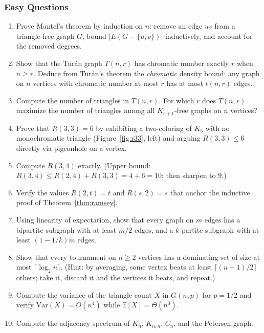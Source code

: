 \documentclass{article}
\theoremstyle{definition}
\begin{document}
\subsubsection{Easy Questions}
\begin{enumerate}
\item Prove Mantel's theorem by induction on $n$: remove an edge $uv$ from
a triangle-free graph $G$, bound $|E(G - \{u, v\})|$ inductively, and
account for the removed degrees.

\item Show that the Tur\'an graph $T(n, r)$ has chromatic number exactly
$r$ when $n \ge r$. Deduce from Tur\'an's theorem the \emph{chromatic} density
bound: any graph on $n$ vertices with chromatic number at most $r$
has at most $t(n, r)$ edges.

\item Compute the number of triangles in $T(n, r)$. For which $r$ does
$T(n, r)$ maximize the number of triangles among all $K_{r+1}$-free
graphs on $n$ vertices?

\item Prove that $R(3, 3) = 6$ by exhibiting a two-coloring of $K_5$ with
no monochromatic triangle (Figure~\ref{fig:r33}, left) and arguing
$R(3, 3) \le 6$ directly via pigeonhole on a vertex.

\item Compute $R(3, 4)$ exactly. (Upper bound: $R(3, 4) \le R(2, 4) + R(3, 3) = 4 + 6 = 10$;
then sharpen to $9$.)

\item Verify the values $R(2, t) = t$ and $R(s, 2) = s$ that anchor the
inductive proof of Theorem~\ref{thm:ramsey}.

\item Using linearity of expectation, show that every graph on $m$ edges
has a bipartite subgraph with at least $m/2$ edges, and a $k$-partite
subgraph with at least $(1 - 1/k)m$ edges.

\item Show that every tournament on $n \ge 2$ vertices has a dominating set of
size at most $\lceil \log_2 n \rceil$. (Hint: by averaging, some vertex
beats at least $\lceil (n-1)/2 \rceil$ others; take it, discard it and
the vertices it beats, and repeat.)

\item Compute the variance of the triangle count $X$ in $G(n, p)$ for
$p = 1/2$ and verify $\mathrm{Var}(X) = O(n^4)$ while
$\mathbb{E}[X] = \Theta(n^3)$.

\item Compute the adjacency spectrum of $K_n$, $K_{n, n}$, $C_n$, and the
Petersen graph.


\end{enumerate}
\end{document}
